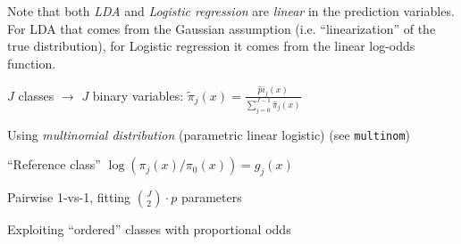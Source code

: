 \begin{notebox}\nospacing{}
  Note that both \emph{LDA} and \emph{Logistic regression} are \emph{linear} in the prediction variables.
  For LDA that comes from the Gaussian assumption (i.e. ``linearization'' of the true distribution), for Logistic regression it comes from the linear log-odds function.
\end{notebox}
\begin{notebox}\nospacing{}
  \begin{enumeratenosep}
    \item $J$ classes $\rightarrow$ $J$ binary variables: $\tilde \pi_j(x) = \frac{\hat pi_j(x)}{\sum_{j=0}^{J-1}\hat\pi_j(x)}$
    \item Using \emph{multinomial distribution} (parametric linear logistic) (see \verb!multinom!)
    \item ``Reference class'' $\log(\pi_j(x)/\pi_0(x)) = g_j(x)$
    \item Pairwise 1-vs-1, fitting ${J \choose 2}\cdot p$ parameters
    \item Exploiting ``ordered'' classes with proportional odds
  \end{enumeratenosep}
\end{notebox}
